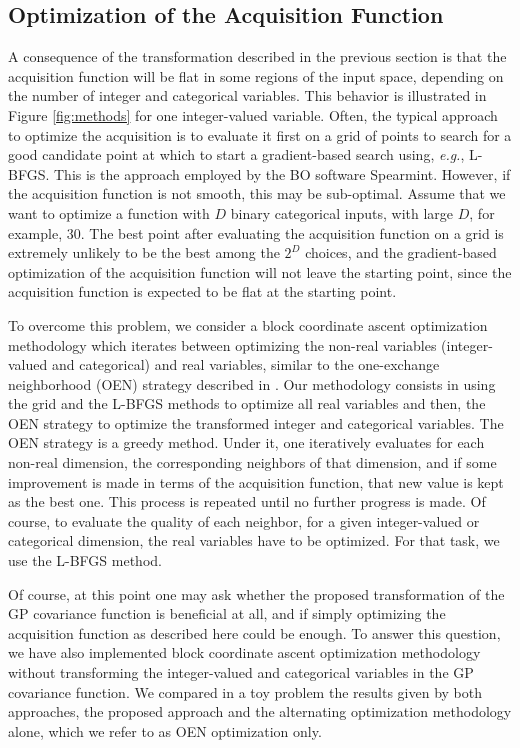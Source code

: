 \subsection{Optimization of the Acquisition Function} \label{sec:acquisition}

A consequence of the transformation described in the previous section is that the
acquisition function will be flat in some regions of the input space, depending on the number of 
integer and categorical variables. This behavior is illustrated in Figure \ref{fig:methods} for one 
integer-valued variable. Often, the typical approach to optimize the acquisition is to evaluate it 
first on a grid of points to search for a good candidate point at which to start a gradient-based search 
using, \emph{e.g.}, L-BFGS. This is the approach employed by the BO software Spearmint. However, if the 
acquisition function is not smooth, this may be sub-optimal. Assume that we want to optimize a function 
with $D$ binary categorical inputs, with large $D$, for example, $30$. The best point after evaluating the 
acquisition function on a grid is extremely unlikely to be the best among the $2^D$ choices, and the 
gradient-based optimization of the acquisition function will not leave the starting point, since the 
acquisition function is expected to be flat at the starting point. 

To overcome this problem, we consider a block coordinate ascent optimization methodology which 
iterates between optimizing the non-real variables (integer-valued and categorical) and real variables,
similar to the one-exchange neighborhood (OEN) strategy described in \citep{hutter2009automated,levesque2017bayesian}.
Our methodology consists in using the grid and the L-BFGS methods to optimize all real 
variables and then, the OEN strategy to optimize the transformed integer and categorical variables. 
The OEN strategy is a greedy method. Under it, one iteratively evaluates for each non-real dimension, 
the corresponding neighbors of that dimension, and if some improvement is made in terms of the acquisition function, that new value is kept as the best 
one. This process is repeated until no further progress is made. Of course, to evaluate the quality of each neighbor, 
for a given integer-valued or categorical dimension, the real variables have to be optimized. For that task, we use the 
L-BFGS method. 

Of course, at this point one may ask whether the proposed transformation of the GP covariance function is beneficial
at all, and if simply optimizing the acquisition function as described here could be enough. To answer this question,
we have also implemented block coordinate ascent optimization methodology without transforming the integer-valued 
and categorical variables in the GP covariance function. We compared in a toy problem the results given by both approaches, 
the proposed approach and the alternating optimization methodology alone, which we refer to as OEN optimization only. 

